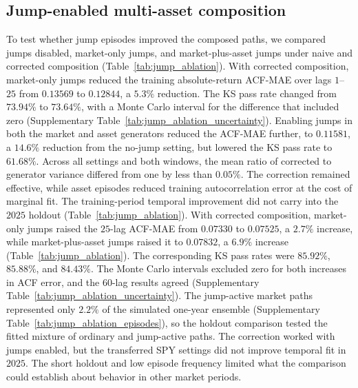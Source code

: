\subsection{Jump-enabled multi-asset composition}
\label{sec:results-jump-composition}

To test whether jump episodes improved the composed paths, we compared
jumps disabled, market-only jumps, and market-plus-asset jumps under
naive and corrected composition (Table~\ref{tab:jump_ablation}).
With corrected composition, market-only jumps reduced the training
absolute-return ACF-MAE over lags $1$--$25$ from $0.13569$ to
$0.12844$, a $5.3\%$ reduction. The KS pass rate changed from
$73.94\%$ to $73.64\%$, with a Monte Carlo interval for the difference
that included zero (Supplementary Table~\ref{tab:jump_ablation_uncertainty}).
Enabling jumps in both the market and asset generators reduced the
ACF-MAE further, to $0.11581$, a $14.6\%$ reduction from the no-jump
setting, but lowered the KS pass rate to $61.68\%$. Across all settings
and both windows, the mean ratio of corrected to generator variance
differed from one by less than $0.05\%$. The correction remained effective,
while asset episodes reduced training autocorrelation error at the
cost of marginal fit.
The training-period temporal improvement did not carry into the
$2025$ holdout (Table~\ref{tab:jump_ablation}). With corrected composition, market-only jumps raised
the $25$-lag ACF-MAE from $0.07330$ to $0.07525$, a $2.7\%$
increase, while market-plus-asset jumps raised it to $0.07832$, a
$6.9\%$ increase (Table~\ref{tab:jump_ablation}). The corresponding
KS pass rates were $85.92\%$, $85.88\%$, and $84.43\%$.
The Monte Carlo intervals excluded zero for both increases in ACF
error, and the $60$-lag results agreed
(Supplementary Table~\ref{tab:jump_ablation_uncertainty}). The jump-active market
paths represented only $2.2\%$ of the simulated one-year ensemble
(Supplementary Table~\ref{tab:jump_ablation_episodes}), so the holdout comparison tested the fitted mixture of ordinary and
jump-active paths. The correction worked with jumps enabled, but the transferred SPY
settings did not improve temporal fit in $2025$. The short holdout
and low episode frequency limited what the comparison could establish
about behavior in other market periods.

